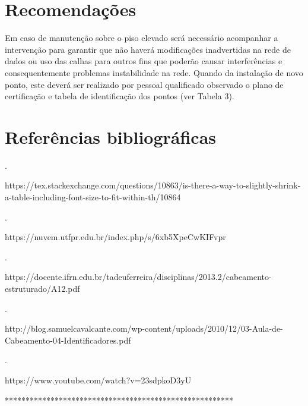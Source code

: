 \documentclass[	DIV=calc,%
							paper=a4,%
							fontsize=12pt,%
							onecolumn]{scrartcl}	 					%
\begin{document}
\section{Recomendações}
Em caso de manutenção sobre o piso elevado será necessário acompanhar a intervenção para garantir que não haverá modificações inadvertidas na rede de dados ou uso das calhas para outros fins que poderão causar interferências e consequentemente problemas instabilidade na rede.
Quando da instalação de novo ponto, este deverá ser realizado por pessoal qualificado observado o plano de certificação e tabela de identificação dos pontos (ver Tabela 3).

\section{Referências bibliográficas}
.

https://tex.stackexchange.com/questions/10863/is-there-a-way-to-slightly-shrink-a-table-including-font-size-to-fit-within-th/10864

.

https://nuvem.utfpr.edu.br/index.php/s/6xb5XpeCwKIFvpr

.

https://docente.ifrn.edu.br/tadeuferreira/disciplinas/2013.2/cabeamento-estruturado/A12.pdf

.

http://blog.samuelcavalcante.com/wp-content/uploads/2010/12/03-Aula-de-Cabeamento-04-Identificadores.pdf

.

https://www.youtube.com/watch?v=23sdpkoD3yU 

*******************************************************
\end{document}

